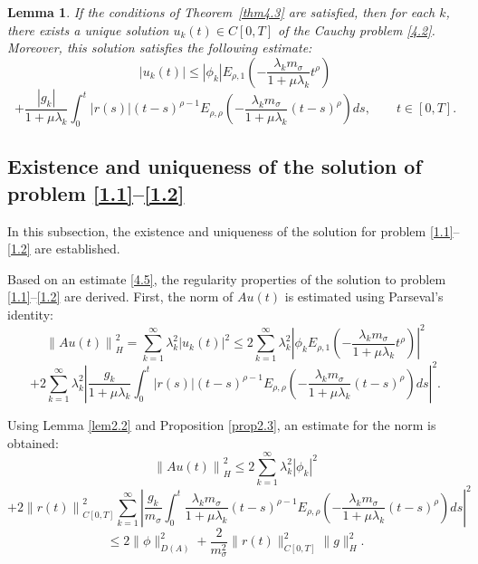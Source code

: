 \documentclass[reqno]{amsart}
\newtheorem{lem}[thm]{Lemma}
\theoremstyle{definition}
\numberwithin{equation}{section}
\begin{document}
\begin{lem} \label{lem4.4} If the conditions of Theorem~\ref{thm4.3} are satisfied, then for each $k$, there exists a unique solution $u_k(t) \in C[0,T]$ of the Cauchy problem \eqref{4.2}. Moreover, this solution satisfies the following estimate:
$$
\left|u_k(t)\right| \leq\left|\phi_k\right| E_{\rho, 1}\left(-\frac{\lambda_k m_\sigma}{1+\mu \lambda_k}t^\rho\right)
$$
\begin{equation}\label{4.5}
 + \frac{\left|g_k\right|}{1+\mu \lambda_k} \int_0^t|r(s)|(t-s)^{\rho-1} E_{\rho, \rho}\left(-\frac{\lambda_k m_\sigma}{1+\mu \lambda_k}(t-s)^\rho\right) ds,  \qquad t\in [0,T].
\end{equation}
\end{lem}

\subsection{Existence and uniqueness of the solution of problem \eqref{1.1}–\eqref{1.2}} In this subsection, the existence and uniqueness of the solution for problem \eqref{1.1}–\eqref{1.2} are established.

Based on an estimate \eqref{4.5}, the regularity properties of the solution to problem \eqref{1.1}–\eqref{1.2} are derived. First, the norm of $Au(t)$ is estimated using Parseval’s identity:
$$
\left\| Au(t) \right\|_{H}^{2}=\sum\limits_{k=1}^{\infty }{\lambda _{k}^{2}{{\left| {{u}_{k}}(t) \right|}^{2}}} \le 2\sum\limits_{k=1}^{\infty }{\lambda _{k}^{2}{{\left| {{\phi }_{k}}{{E}_{\rho ,1}}\left( -\frac{{{\lambda }_{k}}{{m}_{\sigma }}}{1+\mu {{\lambda }_{k}}}{{t}^{\rho }} \right) \right|}^{2}}}
$$
$$
+2\sum\limits_{k=1}^{\infty }{\lambda _{k}^{2}{{\left| \frac{{{g}_{k}}}{1+\mu {{\lambda }_{k}}}\int_{0}^{t}{\left| r(s) \right|{{(t-s)}^{\rho -1}}{{E}_{\rho ,\rho }}\left( -\frac{{{\lambda }_{k}}{{m}_{\sigma }}}{1+\mu {{\lambda }_{k}}}{{(t-s)}^{\rho }} \right)ds} \right|}^{2}}}.
$$

Using Lemma \ref{lem2.2} and Proposition \ref{prop2.3}, an estimate for the norm is obtained:
$$
\left\| Au(t) \right\|_{H}^{2}\le 2\sum\limits_{k=1}^{\infty }{\lambda _{k}^{2}{{\left| {{\phi }_{k}} \right|}^{2}}}
$$
$$
+2\left\| r(t) \right\|_{C[0,T]}^{2}\sum\limits_{k=1}^{\infty }{{{\left| \frac{{{g}_{k}}}{{{m}_{\sigma }}}\int_{0}^{t}{\frac{{{\lambda }_{k}}{{m}_{\sigma }}}{1+\mu {{\lambda }_{k}}}{{(t-s)}^{\rho -1}}{{E}_{\rho ,\rho }}\left( -\frac{{{\lambda }_{k}}{{m}_{\sigma }}}{1+\mu {{\lambda }_{k}}}{{(t-s)}^{\rho }} \right)ds} \right|}^{2}}}
$$
$$
\leq 2\|\phi\|_{D(A)}^2+\frac{2}{m_\sigma^2}\|r(t)\|_{C[0, T]}^2\|g\|_H^2.
$$
\end{document}
